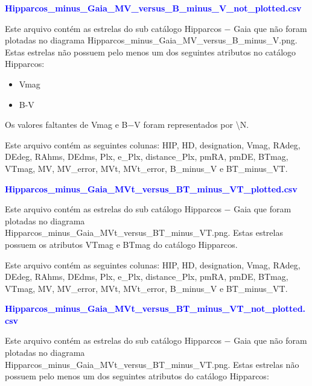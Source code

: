 \documentclass{article}
\begin{document}
	\vspace{10pt}
		
	\textcolor{blue}{\textbf{Hipparcos\_minus\_Gaia\_MV\_versus\_B\_minus\_V\_not\_plotted.csv}}	
	
	\vspace{10pt}
		
	Este arquivo contém as estrelas do sub catálogo Hipparcos $-$ Gaia que não foram plotadas no diagrama Hipparcos\_minus\_Gaia\_MV\_versus\_B\_minus\_V.png.
	Estas estrelas não possuem pelo menos um dos seguintes atributos no catálogo Hipparcos: 
	
	\begin{itemize}
		\item Vmag
		\item B-V
	\end{itemize}

	Os valores faltantes de Vmag e B$-$V foram representados por \textbackslash N.
	
	Este arquivo contém as seguintes colunas:
	HIP, HD, designation, Vmag, RAdeg, DEdeg, RAhms, DEdms, Plx, e\_Plx, distance\_Plx, pmRA, pmDE, BTmag, VTmag, MV, MV\_error, MVt, MVt\_error, B\_minus\_V e BT\_minus\_VT.
	
	\vspace{10pt}
		
	\textcolor{blue}{\textbf{Hipparcos\_minus\_Gaia\_MVt\_versus\_BT\_minus\_VT\_plotted.csv}}
	
	\vspace{10pt}

	Este arquivo contém as estrelas do sub catálogo Hipparcos $-$ Gaia que foram plotadas no diagrama Hipparcos\_minus\_Gaia\_MVt\_versus\_BT\_minus\_VT.png.
	Estas estrelas possuem os atributos VTmag e BTmag do catálogo Hipparcos.
	
	Este arquivo contém as seguintes colunas:
	HIP, HD, designation, Vmag, RAdeg, DEdeg, RAhms, DEdms, Plx, e\_Plx, distance\_Plx, pmRA, pmDE, BTmag, VTmag, MV, MV\_error, MVt, MVt\_error, B\_minus\_V e BT\_minus\_VT.
	
	\newpage
	
	\textcolor{blue}{\textbf{Hipparcos\_minus\_Gaia\_MVt\_versus\_BT\_minus\_VT\_not\_plotted.csv}}
	
	\vspace{10pt}
	
	Este arquivo contém as estrelas do sub catálogo Hipparcos $-$ Gaia que não foram plotadas no diagrama Hipparcos\_minus\_Gaia\_MVt\_versus\_BT\_minus\_VT.png.
	Estas estrelas não possuem pelo menos um dos seguintes atributos do catálogo Hipparcos: 
	
\end{document}

